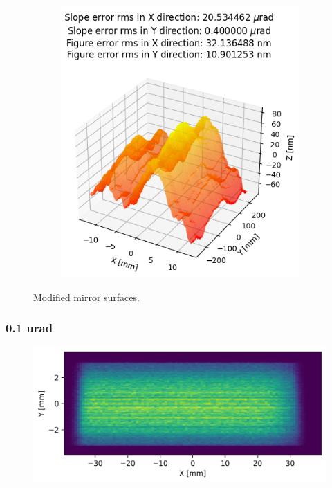 \begin{figure}
\begin{subfigure}{0.33\textwidth}
\end{subfigure}
\hfill %
\begin{subfigure}{0.33\textwidth}
\includegraphics[width=0.9\linewidth]{./../figures/slope_error/surface_error_profile_500x25_04x20urad.png}
\end{subfigure}
\caption{\label{fig:fractals} Modified mirror surfaces. }
\end{figure}

\clearpage
\subsubsection{0.1 urad}
\begin{figure}[H]
\centering
\includegraphics[width=0.9\linewidth]{./../figures/slope_error/WB4C_d30_d-spacing_gradient_45keV_slope_error01urad.png}
\end{figure}

